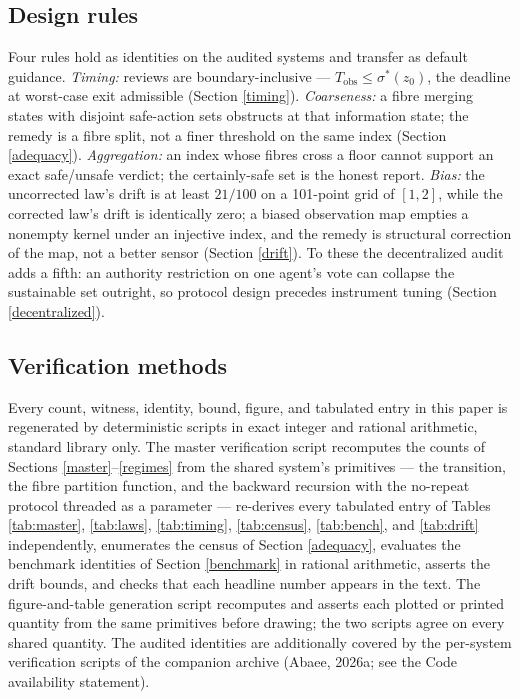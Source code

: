 \documentclass[10pt,twocolumn]{article}
\theoremstyle{definition}
\begin{document}
\subsection{Design rules}\label{rules}

Four rules hold as identities on the audited systems and transfer as
default guidance. \emph{Timing:} reviews are boundary-inclusive ---
\(T_{\mathrm{obs}} \le \sigma^{*}(z_0)\), the deadline at worst-case
exit admissible (Section \ref{timing}). \emph{Coarseness:} a fibre
merging states with disjoint safe-action sets obstructs at that
information state; the remedy is a fibre split, not a finer threshold
on the same index (Section \ref{adequacy}). \emph{Aggregation:} an
index whose fibres cross a floor cannot support an exact
safe/unsafe verdict; the certainly-safe set is the honest report.
\emph{Bias:} the uncorrected law's drift is at least \(21/100\) on a
101-point grid of \([1,2]\), while the corrected law's drift is
identically zero; a biased observation map empties a nonempty kernel
under an injective index, and the remedy is structural correction of
the map, not a better sensor (Section \ref{drift}). To these the
decentralized audit adds a fifth: an authority restriction on one
agent's vote can collapse the sustainable set outright, so protocol
design precedes instrument tuning (Section \ref{decentralized}).

\subsection{Verification methods}\label{methods}

Every count, witness, identity, bound, figure, and tabulated entry in
this paper is regenerated by deterministic scripts in exact integer and
rational arithmetic, standard library only. The master verification
script recomputes the counts of Sections \ref{master}--\ref{regimes}
from the shared system's primitives --- the transition, the fibre
partition function, and the backward recursion with the no-repeat
protocol threaded as a parameter --- re-derives every tabulated entry of
Tables \ref{tab:master}, \ref{tab:laws}, \ref{tab:timing},
\ref{tab:census}, \ref{tab:bench}, and \ref{tab:drift} independently,
enumerates the census of Section \ref{adequacy}, evaluates the
benchmark identities of Section \ref{benchmark} in rational
arithmetic, asserts the drift bounds, and checks that each headline
number appears in the text. The figure-and-table generation script
recomputes and asserts each plotted or printed quantity from the same
primitives before drawing; the two scripts agree on every shared
quantity. The audited identities are additionally covered by the
per-system verification scripts of the companion archive (Abaee, 2026a;
see the Code availability statement).
\end{document}

